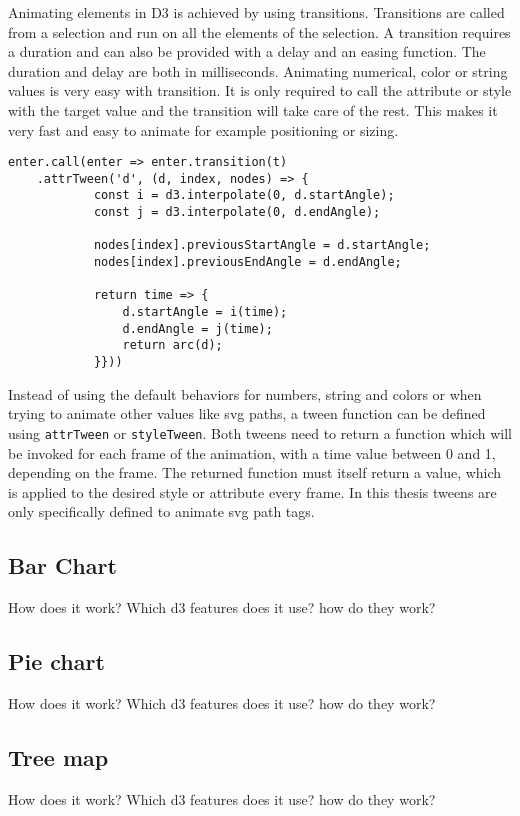 Animating elements in D3 is achieved by using transitions. Transitions are called from a selection and run on all the elements of the selection. A transition requires a duration and can also be provided with a delay and an easing function. The duration and delay are both in milliseconds. Animating numerical, color or string values is very easy with transition. It is only required to call the attribute or style with the target value and the transition will take care of the rest. This makes it very fast and easy to animate for example positioning or sizing.

\begin{lstlisting}[style=htmlcssjs]
    enter.call(enter => enter.transition(t)
    .attrTween('d', (d, index, nodes) => {
            const i = d3.interpolate(0, d.startAngle);
            const j = d3.interpolate(0, d.endAngle);

            nodes[index].previousStartAngle = d.startAngle;
            nodes[index].previousEndAngle = d.endAngle;

            return time => {
                d.startAngle = i(time);
                d.endAngle = j(time);
                return arc(d);
            }}))
\end{lstlisting}

Instead of using the default behaviors for numbers, string and colors or when trying to animate other values like svg paths, a tween function can be defined using \verb|attrTween| or \verb|styleTween|. Both tweens need to return a function which will be invoked for each frame of the animation, with a time value between 0 and 1, depending on the frame. The returned function must itself return a value, which is applied to the desired style or attribute every frame. In this thesis tweens are only specifically defined to animate svg path tags.


\subsection{Bar Chart}
How does it work? Which d3 features does it use? how do they work?

\subsection{Pie chart}
How does it work? Which d3 features does it use? how do they work?

\subsection{Tree map}
How does it work? Which d3 features does it use? how do they work?

